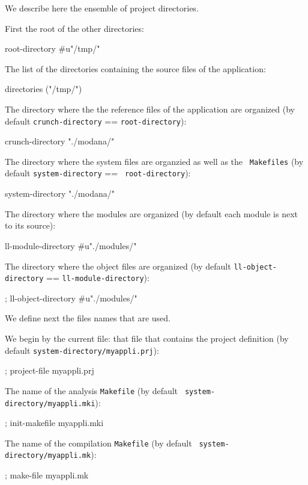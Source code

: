 We describe here the ensemble of project directories.

First the root of the other directories:
\begin{Code*}
        root-directory #u"/tmp/"
\end{Code*}
The list of the directories containing the source files of the application:
\begin{Code*}
        directories ("/tmp/")
\end{Code*}

The directory where the the reference files of the application are organized (by default {\tt crunch-directory} == {\tt root-directory}):
\begin{Code*}
        crunch-directory "./modana/" 
\end{Code*}

The directory where the system files are organzied as well as the {\tt
Makefiles} (by default {\tt system-directory} == {\tt
root-directory}):
\begin{Code*}
        system-directory "./modana/" 
\end{Code*}

The directory where the modules are organized (by default each module is next to its source):
\begin{Code*}
        ll-module-directory #u"./modules/"
\end{Code*}

The directory where the object files are organized (by default {\tt ll-object-directory} == {\tt ll-module-directory}):
\begin{Code*}
        ; ll-object-directory #u"./modules/"
\end{Code*}

We define next the files names that are used.

We begin by the current file:  that file that contains the project definition (by default {\tt system-directory/myappli.prj}):
\begin{Code*}
        ; project-file myappli.prj
\end{Code*}

The name of the analysis {\tt Makefile} (by default {\tt
system-directory/myappli.mki}):
\begin{Code*}
        ; init-makefile myappli.mki
\end{Code*}

The name of the compilation {\tt Makefile} (by default {\tt
system-directory/myappli.mk}):
\begin{Code*}
        ; make-file myappli.mk
\end{Code*}

